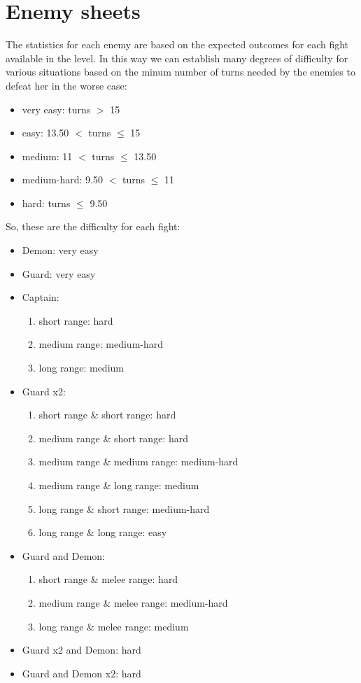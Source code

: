 \section{Enemy sheets}

The statistics for each enemy are based on the expected outcomes for each fight available in the level. In this way we can establish many degrees of difficulty for various situations based on the minum number of turns needed by the enemies to defeat her in the worse case:
\begin{itemize}
  \item very easy: turns $>$ 15
  \item easy: 13.50 $<$ turns $\le$ 15
  \item medium: 11 $<$ turns $\le$ 13.50
  \item medium-hard: 9.50 $<$ turns $\le$ 11
    \item hard: turns $\le$ 9.50
\end{itemize}
So, these are the difficulty for each fight:
\begin{itemize}
\item Demon: very easy
\item Guard: very easy
\item Captain:
  \begin{enumerate}
  \item short range: hard
  \item medium range: medium-hard
  \item long range:  medium
  \end{enumerate}
\item Guard x2:
  \begin{enumerate}
   \item short range \& short range: hard
   \item medium range \& short range: hard
   \item medium range \& medium range: medium-hard
   \item medium range \& long range: medium
   \item long range \& short range:  medium-hard
   \item long range \& long range: easy
   \end{enumerate}
 \item Guard and Demon:
   \begin{enumerate}
    \item short range \& melee range: hard
   \item medium range \& melee range: medium-hard
   \item long range \& melee range: medium
    \end{enumerate}
  \item Guard x2 and Demon: hard
  \item Guard and Demon x2: hard
\end{itemize}


